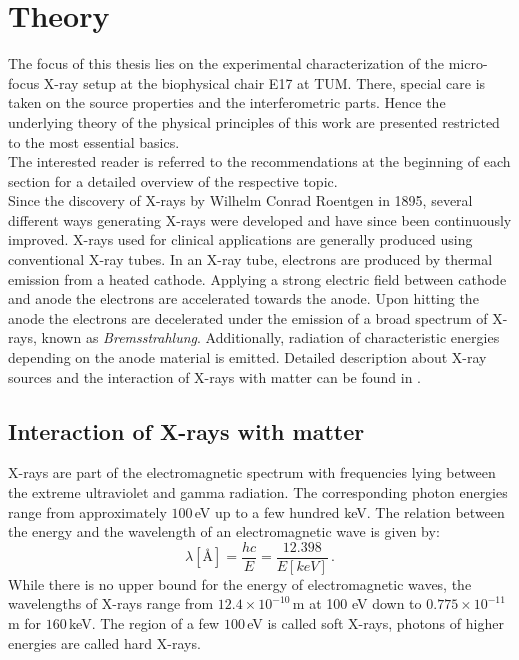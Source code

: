 \chapter{Theory}\label{chap:th}
The focus of this thesis lies on the experimental characterization of the micro-focus X-ray setup at the biophysical chair E17 at TUM. There, special care is taken on the source properties and the interferometric parts. 
Hence the underlying theory of the physical principles of this work are presented restricted to the most essential basics.\\
The interested reader is referred to the recommendations at the beginning of each section for a detailed overview of the respective topic.\\
Since the discovery of X-rays by Wilhelm Conrad Roentgen in 1895, several different ways generating X-rays were developed 
and have since been continuously improved. X-rays used for clinical applications are generally produced using conventional X-ray tubes. In an X-ray tube, electrons are produced by thermal emission from a heated cathode. Applying a strong electric field between cathode and anode the electrons are accelerated towards the anode. Upon hitting the anode the electrons are decelerated under the emission of a broad spectrum of X-rays, known as \textit{Bremsstrahlung}. Additionally, radiation of characteristic energies depending on the anode material is emitted. Detailed description about X-ray sources and the interaction of X-rays with matter can be found in \cite{Veen2004,Als-nielsen}.
\section{Interaction of X-rays with matter}\label{sec:ixm}
X-rays are part of the electromagnetic spectrum with frequencies lying between the extreme ultraviolet and gamma radiation. The corresponding photon energies range from approximately $100\,$eV up to a few hundred keV. 
The relation between the energy and the wavelength of an electromagnetic wave is given by:
\begin{equation}
\lambda \left[\text{\AA} \right] = \frac{hc}{E}=\frac{12.398}{E \left[keV \right]}\,.
\end{equation}\label{lEdep}
While there is no upper bound for the energy of electromagnetic waves, the wavelengths of X-rays range from $12.4 \times 10^{-10}\,$m at 100 eV down to $0.775 \times 10^{-11}\,$m for $160\,$keV. The region of a few $100\,$eV is called soft X-rays, photons of higher energies are called hard X-rays.          
